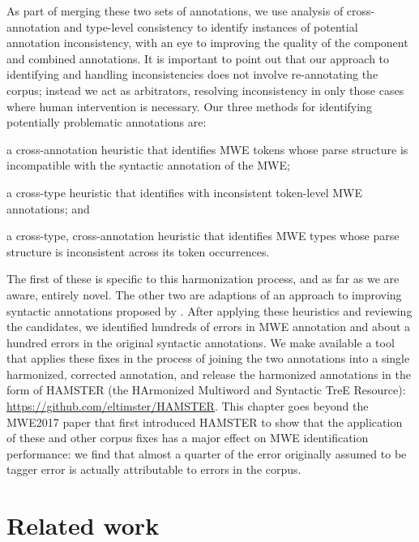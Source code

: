 \documentclass[output=paper,modfonts,nonflat]{langsci/langscibook}
\begin{document}
As part of merging these two sets of annotations, we use analysis of cross-annotation and type-level consistency to identify instances of potential annotation inconsistency, with an eye to improving the quality of the component and combined annotations. It is important to point out that our approach to identifying and handling inconsistencies does not involve re-annotating the corpus; instead we act as arbitrators, resolving inconsistency in only those cases where human intervention is necessary. Our three methods for identifying potentially problematic annotations are:
\begin{compactitem}
\item a cross-annotation heuristic that identifies MWE tokens whose parse structure is incompatible with the syntactic annotation of the MWE;
\item a cross-type heuristic that identifies \ngram[s] with inconsistent token-level MWE annotations; and
\item a cross-type, cross-annotation heuristic that identifies MWE types whose parse structure is inconsistent across its token occurrences.
\end{compactitem}
The first of these is specific to this harmonization process, and as far as we are aware, entirely novel. The other two are adaptions of an approach to improving syntactic annotations proposed by \citet{Dickinson03}. After applying these heuristics and reviewing the candidates, we identified hundreds of errors in MWE annotation and about a hundred errors in the original syntactic annotations. We make available a tool that applies these fixes in the process of joining the two annotations into a single harmonized, corrected annotation, and release the harmonized annotations in the form of HAMSTER (the HArmonized Multiword and Syntactic TreE Resource): \url{https://github.com/eltimster/HAMSTER}. This chapter goes beyond the MWE2017 paper that first introduced HAMSTER \citep{Chan+:2017} to show that the application of these and other corpus fixes has a major effect on MWE identification performance: we find that almost a quarter of the error originally assumed to be tagger error is actually attributable to errors in the corpus.


\section{Related work}
\label{sec:relwork}
\end{document}
